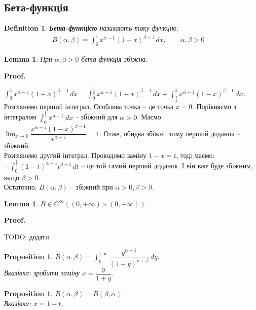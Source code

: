 \documentclass[a4paper, 10pt]{article}
\makeatletter
\def\huge{\displaystyle}
\theoremstyle{theoremdd}
\theoremstyle{theoremdd}
\theoremstyle{theoremdd}
\newtheorem{definition}[theorem]{Definition}
\theoremstyle{theoremdd}
\theoremstyle{theoremdd}
\theoremstyle{theoremdd}
\newtheorem{proposition}[theorem]{Proposition}
\theoremstyle{theoremdd}
\theoremstyle{theoremdd}
\newtheorem{lemma}[theorem]{Lemma}
\theoremstyle{theoremdd}
\renewenvironment{proof}[1][Proof.\\]{\par
\pushQED{\hfill \qed}%
\normalfont \topsep6\p@\@plus6\p@\relax
\trivlist
\item\relax
{\bfseries
#1\@addpunct{.}}\hspace\labelsep\ignorespaces
}{%
\popQED\endtrivlist\@endpefalse
}
\makeatother
\begin{document}
\subsection{Бета-функція}
\begin{definition}
\textbf{Бета-функцією} називають таку функцію:
\begin{align*}
B(\alpha,\beta) = \int_0^1 x^{\alpha-1} (1-x)^{\beta-1}\,dx,\qquad \alpha,\beta>0
\end{align*}
\end{definition}

\begin{lemma}
При $\alpha, \beta >0$ бета-функція збіжна.
\end{lemma}

\begin{proof}
$\huge \int_0^1 x^{\alpha-1} (1-x)^{\beta-1}\,dx = \int_0^{\frac{1}{2}} x^{\alpha-1} (1-x)^{\beta-1}\,dx +  \int_{\frac{1}{2}}^1 x^{\alpha-1} (1-x)^{\beta-1}\,dx$.\\
Розглянемо перший інтеграл. Особлива точка -- це точка $x =0$. Порівняємо з інтегралом $\huge \int_0^{\frac{1}{2}} x^{\alpha - 1} \,dx$ -- збіжний для $\alpha > 0$. Маємо\\
$\huge \lim_{x \to 0} \dfrac{x^{\alpha-1}(1-x)^{\beta-1}}{x^{\alpha-1}} = 1$. Отже, обидва збіжні, тому перший доданок -- збіжний.\\
Розглянемо другий інтеграл. Проводимо заміну $1-x=t$, тоді маємо:\\
$-\huge \int_{0}^{\frac{1}{2}} (1-t)^{\alpha-1} t^{\beta - 1}\,dt$ -- це той самий перший доданок. І він вже буде збіжним, якщо $\beta > 0$.\\
Остаточно, $B(\alpha, \beta)$ -- збіжний при $\alpha > 0,\beta > 0$.
\end{proof}

\begin{lemma}
$B \in C^{\infty}((0,+\infty) \times (0,+\infty))$.
\end{lemma}

\begin{proof}
TODO: додати.
\end{proof}

\begin{proposition}
$B(\alpha, \beta) = \huge \int_0^{+\infty} \dfrac{y^{\alpha-1}}{(1+y)^{\alpha+\beta}}\,dy$.\\
\textit{Вказівка: зробити заміну} $x = \dfrac{y}{1+y}$.
\end{proposition}

\begin{proposition}
$B(\alpha,\beta) = B(\beta,\alpha)$.\\
\textit{Вказівка: $x = 1-t$}.
\end{proposition}
\end{document}
